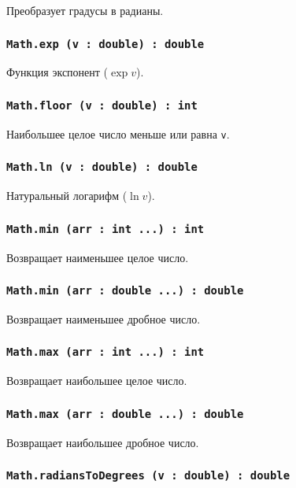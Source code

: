 Преобразует градусы в радианы.

\subsubsection{\texttt{Math.exp (v : double) : double}}

Функция экспонент ($\exp{v}$).

\subsubsection{\texttt{Math.floor (v : double) : int}}

Наибольшее целое число меньше или равна \texttt{v}.

\subsubsection{\texttt{Math.ln (v : double) : double}}

Натуральный логарифм ($\ln{v}$).

\subsubsection{\texttt{Math.min (arr : int ...) : int}}

Возвращает наименьшее целое число.

\subsubsection{\texttt{Math.min (arr : double ...) : double}}

Возвращает наименьшее дробное число.

\subsubsection{\texttt{Math.max (arr : int ...) : int}}

Возвращает наибольшее целое число.

\subsubsection{\texttt{Math.max (arr : double ...) : double}}

Возвращает наибольшее дробное число.

\subsubsection{\texttt{Math.radiansToDegrees (v : double) : double}}


